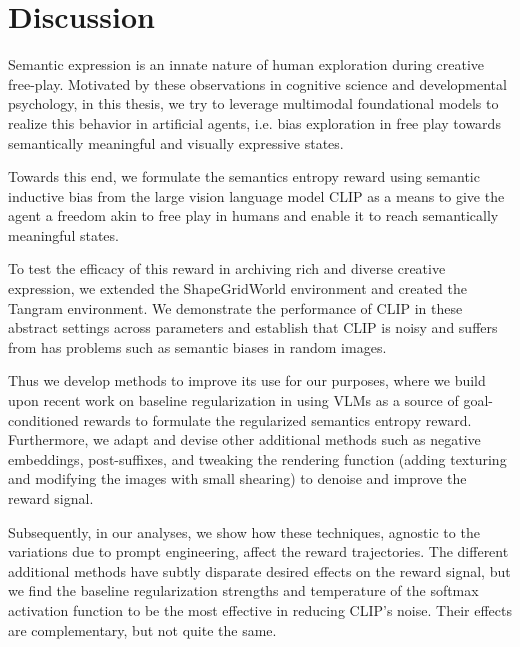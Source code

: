 \chapter{Discussion}
\label{sec:discussion}

Semantic expression is an innate nature of human exploration during creative free-play.
Motivated by these observations in cognitive science and developmental psychology, in this thesis, we try to leverage multimodal foundational models to realize this behavior in artificial agents, i.e. bias exploration in free play towards semantically meaningful and visually expressive states.

Towards this end, we formulate the semantics entropy reward using semantic inductive bias from the large vision language model CLIP as a means to give the agent a freedom akin to free play in humans and enable it to reach semantically meaningful states.

To test the efficacy of this reward in archiving rich and diverse creative expression, we extended the ShapeGridWorld environment and created the Tangram environment.
We demonstrate the performance of CLIP in these abstract settings across parameters and establish that CLIP is noisy and suffers from has problems such as semantic biases in random images.

Thus we develop methods to improve its use for our purposes, where we build upon recent work on baseline regularization in using VLMs as a source of goal-conditioned rewards to formulate the regularized semantics entropy reward.
Furthermore, we adapt and devise other additional methods such as negative embeddings, post-suffixes, and tweaking the rendering function (adding texturing and modifying the images with small shearing) to denoise and improve the reward signal.

Subsequently, in our analyses, we show how these techniques, agnostic to the variations due to prompt engineering, affect the reward trajectories.
The different additional methods have subtly disparate desired effects on the reward signal, but we find the baseline regularization strengths and temperature of the softmax activation function to be the most effective in reducing CLIP's noise.
Their effects are complementary, but not quite the same.


